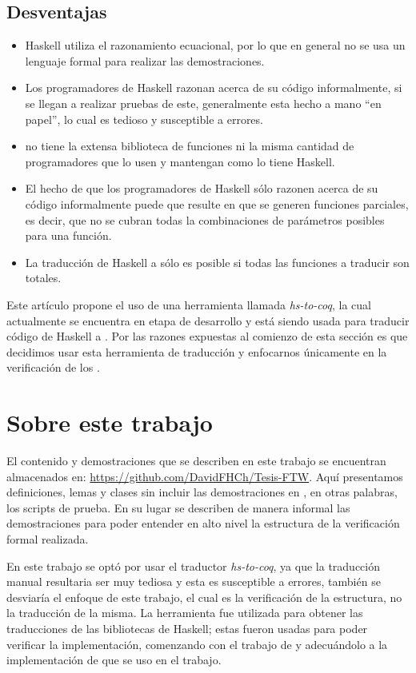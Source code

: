 \subsection{Desventajas}
\begin{itemize}
    \item Haskell utiliza el razonamiento ecuacional, por lo que en general no se usa un lenguaje 
    formal para realizar las demostraciones.
    \item Los programadores de Haskell razonan acerca de su código informalmente, si se llegan a
    realizar pruebas de este, generalmente esta hecho a mano ``en papel'', lo cual es tedioso y
    susceptible a errores.
    \item {\coq} no tiene la extensa biblioteca de funciones ni la misma cantidad de programadores
    que lo usen y mantengan como lo tiene Haskell.
    \item El hecho de que los programadores de Haskell s\'olo razonen acerca de su código
    informalmente puede que resulte en que se generen funciones parciales, es decir, que no se
    cubran todas la combinaciones de parámetros posibles para una funci\'on.
    \item La traducci\'on de Haskell a {\coq} s\'olo es posible si todas las funciones a traducir 
    son totales.
\end{itemize}

Este art\'iculo propone el uso de una herramienta llamada \textit{hs-to-coq}, la cual actualmente se
encuentra en etapa de desarrollo y est\'a siendo usada para traducir código de Haskell a {\coq}. Por
las razones expuestas al comienzo de esta secci\'on es que decidimos usar esta herramienta de 
traducci\'on y enfocarnos \'unicamente en la verificaci\'on de los {\arns}.

\section{Sobre este trabajo}
El contenido y demostraciones que se describen en este trabajo se encuentran almacenados en:
\url{https://github.com/DavidFHCh/Tesis-FTW}. Aqu\'i presentamos definiciones, lemas y clases sin
incluir las demostraciones en {\coq}, en otras palabras, los scripts de prueba. En su lugar se 
describen de manera informal las demostraciones para poder entender en alto nivel la estructura de 
la verificaci\'on formal realizada.

En este trabajo se opt\'o por usar el traductor \textit{hs-to-coq}, ya que la traducci\'on manual
resultaria ser muy tediosa y esta es susceptible a errores, tambi\'en se desviaría el enfoque de
este trabajo, el cual es la verificaci\'on de la estructura, no la traducci\'on de la misma. La
herramienta fue utilizada para obtener las traducciones de las bibliotecas de Haskell; estas fueron
usadas para poder verificar la implementación, comenzando con el trabajo de \cite{tesisG} y 
adecuándolo a la implementaci\'on de \cite{MSetRBT} que se uso en el trabajo.

